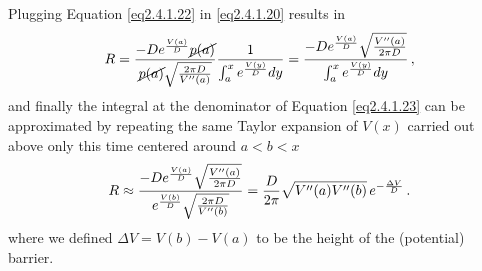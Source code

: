 \documentclass[../main.tex]{subfiles}
\begin{document}
Plugging Equation \eqref{eq2.4.1.22} in \eqref{eq2.4.1.20} results in
\begin{equation}\label{eq2.4.1.23}
        R = \frac{-De^{\frac{V(a)}{D}}\cancel{p(a)}}{\cancel{p(a)}\sqrt{\frac{2\pi D}{V''(a)}}}\frac{1}{\int_{a}^{x}e^{\frac{V(y)}{D}}dy} = \frac{-De^{\frac{V(a)}{D}}\sqrt{\frac{V''(a)}{2\pi D}}}{\int_{a}^{x}e^{\frac{V(y)}{D}}dy} \,,
\end{equation}
and finally the integral at the denominator of Equation \eqref{eq2.4.1.23} can be approximated by repeating the same Taylor expansion of $V(x)$ carried out above only this time centered around $a<b<x$
\begin{equation}\label{eq2.4.1.24}
        R \approx \frac{-De^{\frac{V(a)}{D}}\sqrt{\frac{V''(a)}{2\pi D}}}{e^{\frac{V(b)}{D}}\sqrt{\frac{2\pi D}{V''(b)}}} = \frac{D}{2\pi}\sqrt{V''(a)V''(b)}\,e^{-\frac{\Delta V}{D}}\,.
\end{equation}
where we defined $\Delta V=V(b)-V(a)$ to be the height of the (potential) barrier.
\end{document}
